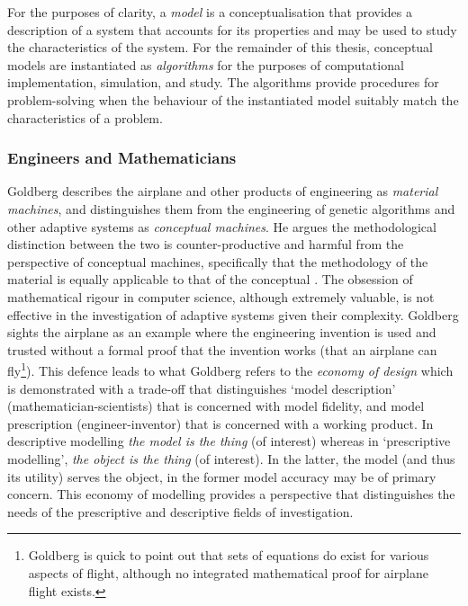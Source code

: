 For the purposes of clarity, a \emph{model} is a conceptualisation that provides a description of a system that accounts for its properties and may be used to study the characteristics of the system. For the remainder of this thesis, conceptual models are instantiated as \emph{algorithms} for the purposes of computational implementation, simulation, and study. The algorithms provide procedures for problem-solving when the behaviour of the instantiated model suitably match the characteristics of a problem.

%
%
\subsubsection{Engineers and Mathematicians}
Goldberg describes the airplane and other products of engineering as \emph{material machines}, and distinguishes them from the engineering of genetic algorithms and other adaptive systems as \emph{conceptual machines}. He argues the methodological distinction between the two is counter-productive and harmful from the perspective of conceptual machines, specifically that the methodology of the material is equally applicable to that of the conceptual \cite{Goldberg1999a}. The obsession of mathematical rigour in computer science, although extremely valuable, is not effective in the investigation of adaptive systems given their complexity. Goldberg sights the airplane as an example where the engineering invention is used and trusted without a formal proof that the invention works (that an airplane can fly\footnote{Goldberg is quick to point out that sets of equations do exist for various aspects of flight, although no integrated mathematical proof for airplane flight exists.}). This defence leads to what Goldberg refers to the \emph{economy of design} which is demonstrated with a trade-off that distinguishes `model description' (mathematician-scientists) that is concerned with model fidelity, and model prescription (engineer-inventor) that is concerned with a working product. In descriptive modelling \emph{the model is the thing} (of interest) whereas in `prescriptive modelling', \emph{the object is the thing} (of interest). In the latter, the model (and thus its utility) serves the object, in the former model accuracy may be of primary concern. This economy of modelling provides a perspective that distinguishes the needs of the prescriptive and descriptive fields of investigation. 

